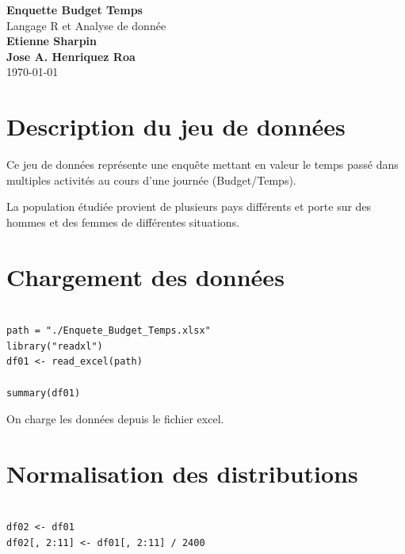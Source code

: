 \documentclass[11pt]{article}
\begin{document}
\begin{titlepage}
  \begin{center}
    \vspace*{1cm} \Huge \textbf{Enquette Budget Temps}\\
    \vspace*{1\baselineskip} Langage R et Analyse de donnée\\
    \vspace*{2\baselineskip} \large
    \vfill \normalsize \textbf{Etienne Sharpin}\\ \textbf{Jose
      A. Henriquez Roa}\\
    \vspace*{2\baselineskip} \today \rhead{\today}
    \newpage
    \normalsize \tableofcontents
    \newpage
  \end{center}
\end{titlepage}


\section{Description du jeu de données}

Ce jeu de données représente une enquête mettant en valeur le temps passé dans multiples activités au cours d’une journée (Budget/Temps).

La population étudiée provient de plusieurs pays différents et porte sur des hommes et des femmes de différentes situations.

\section{Chargement des données}

\begin{verbatim}

path = "./Enquete_Budget_Temps.xlsx"
library("readxl")
df01 <- read_excel(path)

summary(df01)

\end{verbatim}

On charge les données depuis le fichier excel.

\section{Normalisation des distributions}

\begin{verbatim}

df02 <- df01
df02[, 2:11] <- df01[, 2:11] / 2400

\end{verbatim}
\end{document}
